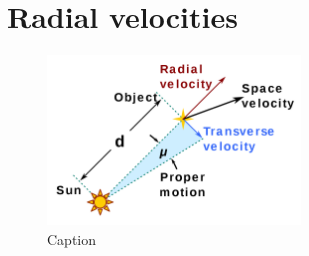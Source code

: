     \section{Radial velocities}
        \begin{figure}[H]
        \centering
        \includegraphics[width=0.6\textwidth]{report/images/chap2_foundations/1280px-Proper_motion.svg.png}
        \caption{Caption}
        \label{2.2a}
        \end{figure}

